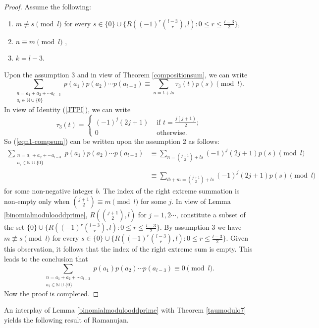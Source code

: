 \documentclass[10pt]{article}
\theoremstyle{definition}
\begin{document}
\begin{proof}
Assume the following: 
\begin{enumerate}
\item $m\not\equiv s\pmod{l}$ for every $s\in\{0\}\cup\bigg\{R\left((-1)^r{{l-3}\choose{r}},l\right):0\leq r\leq\frac{l-3}{2}\bigg\}$,
\item $n\equiv m\pmod{l}$ ,
\item $k=l-3$. 
\end{enumerate}
Upon the assumption 3 and in view of Theorem \ref{compositionsum}, we can write
\begin{equation}\label{eqn1-compsum}
\sum_{\substack{{n=a_1+a_2+\cdots a_{l-3}}\\{a_{i}\in\mathbb{N}\cup\{0\}}}}p(a_{1})p(a_{2})\cdots p(a_{l-3})\equiv \sum_{n=t+ls}\tau_{3}(t)p(s)\pmod{l}.
\end{equation}
In view of Identity (\ref{JTPI}), we can write
\[\tau_3(t)=\begin{cases}
(-1)^j(2j+1)&\text{ if $t=\frac{j(j+1)}{2}$;}\\
0&\text{ otherwise.}
\end{cases}
\]
So (\ref{eqn1-compsum}) can be written upon the assumption 2 as follows:
\begin{align*}
\sum_{\substack{{n=a_1+a_2+\cdots a_{l-3}}\\{a_{i}\in\mathbb{N}\cup\{0\}}}}p(a_{1})p(a_{2})\cdots p(a_{l-3})&\equiv \sum_{n={{j+1}\choose{2}}+ls}(-1)^{j}(2j+1)p(s)\pmod{l}\\
&\equiv\sum_{lb+m={{j+1}\choose{2}}+ls}(-1)^{j}(2j+1)p(s)\pmod{l}
\end{align*}
for some non-negative integer $b$. The index of the right extreme summation is non-empty only when ${{j+1}\choose{2}}\equiv m\pmod{l}$ for some $j$. In view of Lemma \ref{binomialmodulooddprime}, $R\left({{j+1}\choose{2}},{l}\right)$ for $j=1,2\cdots $, constitute a subset of the set $\{0\}\cup\bigg\{R\left((-1)^r{{l-3}\choose{r}},{l}\right): 0\leq r\leq\frac{l-3}{2}\bigg\}$. 
By assumption 3 we have $m\not\equiv s\pmod{l}$ for every $s\in\{0\}\cup\bigg\{R\left((-1)^r{{l-3}\choose{r}}, {l}\right):0\leq r\leq\frac{l-3}{2}\bigg\}$. Given this observation, it follows that the index of the right extreme sum is empty. This leads to the conclusion that 
\[\sum_{\substack{{n=a_1+a_2+\cdots a_{l-3}}\\{a_{i}\in\mathbb{N}\cup\{0\}}}}p(a_{1})p(a_{2})\cdots p(a_{l-3})\equiv 0\pmod{l}.
\]
Now the proof is completed.
\end{proof}
An interplay of Lemma \ref{binomialmodulooddprime} with Theorem \ref{taumodulo7} yields the following result of Ramanujan.
\end{document}
